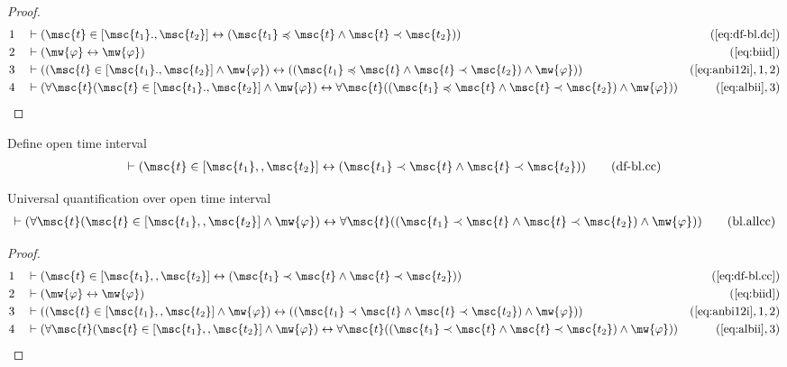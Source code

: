 \begin{proof}
\begin{align}
  1 &&  & \vdash ( \msc{t} \in [ \msc{t_1} ., \msc{t_2} ] \leftrightarrow (
     \msc{t_1} \preccurlyeq \msc{t} \wedge \msc{t} \prec
     \msc{t_2} ) )&(\mbox{\ref{eq:df-bl.dc}})\notag
  \\ 2 &&  & \vdash ( \mw{\varphi} \leftrightarrow \mw{\varphi}
     )&(\mbox{\ref{eq:biid}})\notag
  \\ 3 &&  & \vdash ( ( \msc{t} \in [ \msc{t_1} ., \msc{t_2} ] \wedge
     \mw{\varphi} ) \leftrightarrow ( ( \msc{t_1}
     \preccurlyeq \msc{t} \wedge \msc{t} \prec \msc{t_2} )
     \wedge \mw{\varphi} )
     )&(\mbox{\ref{eq:anbi12i}},1,2)\notag
  \\ 4 &&  & \vdash ( \forall \msc{t} ( \msc{t} \in [ \msc{t_1} ., \msc{t_2} ]
     \wedge \mw{\varphi} ) \leftrightarrow \forall \msc{t}
     ( ( \msc{t_1} \preccurlyeq \msc{t} \wedge \msc{t}
     \prec \msc{t_2} ) \wedge \mw{\varphi} )
     )&(\mbox{\ref{eq:albii}},3)\notag
\end{align}
\end{proof}

\begin{metadefinition} {Define open time interval}
\begin{align}
\vdash ( \msc{t} \in [ \msc{t_1} ,, \msc{t_2} ] \leftrightarrow ( \msc{t_1}
    \prec \msc{t} \wedge \msc{t} \prec \msc{t_2} )
    )\label{eq:df-bl.cc}\tag{df-bl.cc}
\end{align}
\end{metadefinition}


\begin{lemma} {Universal quantification over open time
interval}
\begin{align}
\vdash ( \forall \msc{t} ( \msc{t} \in [ \msc{t_1} ,, \msc{t_2} ] \wedge
    \mw{\varphi} ) \leftrightarrow \forall \msc{t} ( ( \msc{t_1} \prec \msc{t}
    \wedge \msc{t} \prec \msc{t_2} ) \wedge \mw{\varphi} )
    )\label{eq:bl.allcc}\tag{bl.allcc}
\end{align}
\end{lemma}


\begin{proof}
\begin{align}
  1 &&  & \vdash ( \msc{t} \in [ \msc{t_1} ,, \msc{t_2} ] \leftrightarrow (
     \msc{t_1} \prec \msc{t} \wedge \msc{t} \prec
     \msc{t_2} ) )&(\mbox{\ref{eq:df-bl.cc}})\notag
  \\ 2 &&  & \vdash ( \mw{\varphi} \leftrightarrow \mw{\varphi}
     )&(\mbox{\ref{eq:biid}})\notag
  \\ 3 &&  & \vdash ( ( \msc{t} \in [ \msc{t_1} ,, \msc{t_2} ] \wedge
     \mw{\varphi} ) \leftrightarrow ( ( \msc{t_1} \prec
     \msc{t} \wedge \msc{t} \prec \msc{t_2} ) \wedge
     \mw{\varphi} ) )&(\mbox{\ref{eq:anbi12i}},1,2)\notag
  \\ 4 &&  & \vdash ( \forall \msc{t} ( \msc{t} \in [ \msc{t_1} ,, \msc{t_2} ]
     \wedge \mw{\varphi} ) \leftrightarrow \forall \msc{t}
     ( ( \msc{t_1} \prec \msc{t} \wedge \msc{t} \prec
     \msc{t_2} ) \wedge \mw{\varphi} )
     )&(\mbox{\ref{eq:albii}},3)\notag
\end{align}
\end{proof}


